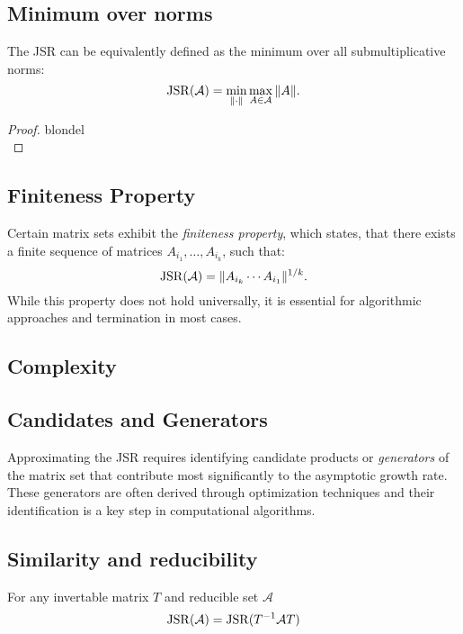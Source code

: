 \subsection*{Minimum over norms}
The JSR can be equivalently defined as the minimum over all submultiplicative norms:
\begin{equation}
    \operatorname{JSR}(\mathcal{A}) = \min_{\|\cdot\|} \max_{A \in \mathcal{A}} \|A\|.
\end{equation}
\begin{proof}{blondel\\}

\end{proof}

\subsection*{Finiteness Property}
Certain matrix sets exhibit the \emph{finiteness property}, which states, that there exists a finite sequence of matrices $A_{i_1}, \dots, A_{i_k}$, such that:
\begin{equation}
    \operatorname{JSR}(\mathcal{A}) = \|A_{i_k} \cdots A_{i_1}\|^{1/k}.
\end{equation}
While this property does not hold universally, it is essential for algorithmic approaches and termination in most cases.

\subsection*{Complexity}

\subsection*{Candidates and Generators}
Approximating the JSR requires identifying candidate products or \emph{generators} of the matrix set that contribute most significantly to the asymptotic growth rate. These generators are often derived through optimization techniques and their identification is a key step in computational algorithms.

\subsection*{Similarity and reducibility}
For any invertable matrix $T$ and reducible set $\mathcal{A}$
\begin{equation}
   \operatorname{JSR}(\mathcal{A}) = \operatorname{JSR}(T^{-1}\mathcal{A}T) 
\end{equation}

